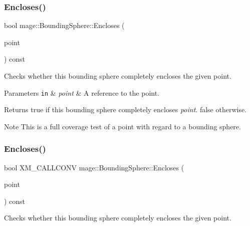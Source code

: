 \subsubsection{\texorpdfstring{Encloses()}{Encloses()}\hspace{0.1cm}{\footnotesize\ttfamily [1/4]}}
{\footnotesize\ttfamily bool mage\+::\+Bounding\+Sphere\+::\+Encloses (\begin{DoxyParamCaption}\item[{const \hyperlink{structmage_1_1_point3}{Point3} \&}]{point }\end{DoxyParamCaption}) const\hspace{0.3cm}{\ttfamily [noexcept]}}

Checks whether this bounding sphere completely encloses the given point.


\begin{DoxyParams}[1]{Parameters}
\mbox{\tt in}  & {\em point} & A reference to the point. \\
\hline
\end{DoxyParams}
\begin{DoxyReturn}{Returns}
{\ttfamily true} if this bounding sphere completely encloses {\itshape point}. {\ttfamily false} otherwise. 
\end{DoxyReturn}
\begin{DoxyNote}{Note}
This is a full coverage test of a point with regard to a bounding sphere. 
\end{DoxyNote}
\hypertarget{classmage_1_1_bounding_sphere_a5174af3edc1f3a5635df5395b54ae352}{}\label{classmage_1_1_bounding_sphere_a5174af3edc1f3a5635df5395b54ae352} 
\subsubsection{\texorpdfstring{Encloses()}{Encloses()}\hspace{0.1cm}{\footnotesize\ttfamily [2/4]}}
{\footnotesize\ttfamily bool X\+M\+\_\+\+C\+A\+L\+L\+C\+O\+NV mage\+::\+Bounding\+Sphere\+::\+Encloses (\begin{DoxyParamCaption}\item[{F\+X\+M\+V\+E\+C\+T\+OR}]{point }\end{DoxyParamCaption}) const\hspace{0.3cm}{\ttfamily [noexcept]}}

Checks whether this bounding sphere completely encloses the given point.


